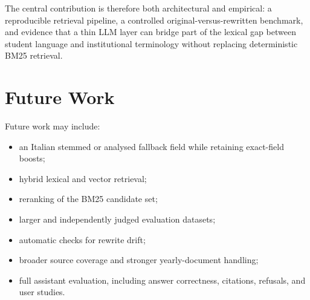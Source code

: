 The central contribution is therefore both architectural and empirical: a reproducible retrieval pipeline, a controlled original-versus-rewritten benchmark, and evidence that a thin LLM layer can bridge part of the lexical gap between student language and institutional terminology without replacing deterministic BM25 retrieval.

\section{Future Work}

Future work may include:

\begin{itemize}
    \item an Italian stemmed or analysed fallback field while retaining exact-field boosts;
    \item hybrid lexical and vector retrieval;
    \item reranking of the BM25 candidate set;
    \item larger and independently judged evaluation datasets;
    \item automatic checks for rewrite drift;
    \item broader source coverage and stronger yearly-document handling;
    \item full assistant evaluation, including answer correctness, citations, refusals, and user studies.
\end{itemize}
\par
